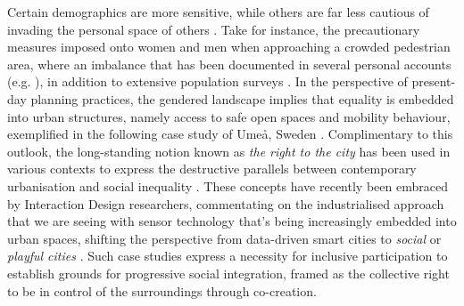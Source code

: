 Certain demographics are more sensitive, while others are far less cautious of invading the personal space of others \citep{peimani_where_2016,remland_interpersonal_1995}. Take for instance, the precautionary measures imposed onto women and men when approaching a crowded pedestrian area, where an imbalance that has been documented in several personal accounts (e.g. \cite{hewitt_i_2021}), in addition to extensive population surveys \citep{matsumoto_gender_2016,rosenbloom_crossing_2009}. In the perspective of present-day planning practices, the gendered landscape implies that equality is embedded into urban structures, namely access to safe open spaces and mobility behaviour, exemplified in the following case study of Umeå, Sweden \citep{sandberg_imagining_2016}. Complimentary to this outlook, the long-standing notion known as \textit{the right to the city} has been used in various contexts to express the destructive parallels between contemporary urbanisation and social inequality \citep{harvey_rebel_2012}. These concepts have recently been embraced by Interaction Design researchers, commentating on the industrialised approach that we are seeing with sensor technology that's being increasingly embedded into urban spaces, shifting the perspective from data-driven smart cities to \textit{social} or \textit{playful cities} \citep{castro_seixas_urban_2021,howell_life-affirming_2019}. Such case studies express a necessity for inclusive participation to establish grounds for progressive social integration, framed as the collective right to be in control of the surroundings through co-creation.

